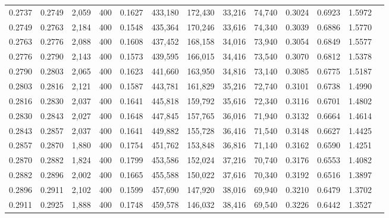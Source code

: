 \begin{tabular}{rrrrrrrrrrrrr}
0.2737 & 0.2749 &  2,059 &   400 &                                     0.1627 & 433,180 & 172,430 &  33,216 &  74,740 & 0.3024 & 0.6923 & 1.5972 \\
0.2749 & 0.2763 &  2,184 &   400 &                                     0.1548 & 435,364 & 170,246 &  33,616 &  74,340 & 0.3039 & 0.6886 & 1.5770 \\
0.2763 & 0.2776 &  2,088 &   400 &                                     0.1608 & 437,452 & 168,158 &  34,016 &  73,940 & 0.3054 & 0.6849 & 1.5577 \\
0.2776 & 0.2790 &  2,143 &   400 &                                     0.1573 & 439,595 & 166,015 &  34,416 &  73,540 & 0.3070 & 0.6812 & 1.5378 \\
0.2790 & 0.2803 &  2,065 &   400 &                                     0.1623 & 441,660 & 163,950 &  34,816 &  73,140 & 0.3085 & 0.6775 & 1.5187 \\
0.2803 & 0.2816 &  2,121 &   400 &                                     0.1587 & 443,781 & 161,829 &  35,216 &  72,740 & 0.3101 & 0.6738 & 1.4990 \\
0.2816 & 0.2830 &  2,037 &   400 &                                     0.1641 & 445,818 & 159,792 &  35,616 &  72,340 & 0.3116 & 0.6701 & 1.4802 \\
0.2830 & 0.2843 &  2,027 &   400 &                                     0.1648 & 447,845 & 157,765 &  36,016 &  71,940 & 0.3132 & 0.6664 & 1.4614 \\
0.2843 & 0.2857 &  2,037 &   400 &                                     0.1641 & 449,882 & 155,728 &  36,416 &  71,540 & 0.3148 & 0.6627 & 1.4425 \\
0.2857 & 0.2870 &  1,880 &   400 &                                     0.1754 & 451,762 & 153,848 &  36,816 &  71,140 & 0.3162 & 0.6590 & 1.4251 \\
0.2870 & 0.2882 &  1,824 &   400 &                                     0.1799 & 453,586 & 152,024 &  37,216 &  70,740 & 0.3176 & 0.6553 & 1.4082 \\
0.2882 & 0.2896 &  2,002 &   400 &                                     0.1665 & 455,588 & 150,022 &  37,616 &  70,340 & 0.3192 & 0.6516 & 1.3897 \\
0.2896 & 0.2911 &  2,102 &   400 &                                     0.1599 & 457,690 & 147,920 &  38,016 &  69,940 & 0.3210 & 0.6479 & 1.3702 \\
0.2911 & 0.2925 &  1,888 &   400 &                                     0.1748 & 459,578 & 146,032 &  38,416 &  69,540 & 0.3226 & 0.6442 & 1.3527 \\

\end{tabular}
